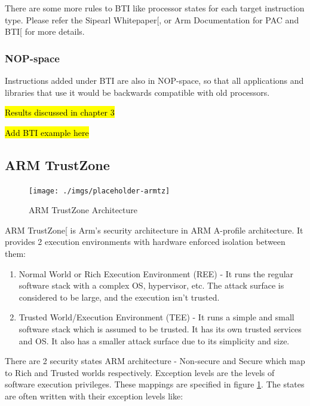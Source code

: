 \documentclass[a4paper, nobind]{templates/ociamthesis}
\providecommand{\tightlist}{%
  \setlength{\itemsep}{0pt}\setlength{\parskip}{0pt}}
\begin{document}
There are some more rules to BTI like processor states for each target instruction type.
Please refer the Sipearl Whitepaper{[}\citeproc{ref-sipearl}{25}{]}, or Arm Documentation for PAC and BTI{[}\citeproc{ref-arm-pacbti}{5}{]} for more details.

\subsubsection{NOP-space}\label{nop-space}

Instructions added under BTI are also in NOP-space, so that all applications and
libraries that use it would be backwards compatible with old processors.

\hl{Results discussed in chapter 3}

\hl{Add BTI example here}

\subsection{ARM TrustZone}\label{arm-trustzone}

\begin{figure}[H]

{\centering \texttt{[image: ./imgs/placeholder-armtz]} 

}

\caption{ARM TrustZone Architecture}\label{fig:armtz-arch}
\end{figure}

ARM TrustZone{[}\citeproc{ref-armtz}{3}{]} is Arm's security architecture in ARM A-profile architecture.
It provides 2 execution environments with hardware enforced isolation between them:

\begin{enumerate}
\def\labelenumi{\arabic{enumi}.}
\tightlist
\item
  Normal World or Rich Execution Environment (REE) - It runs the regular software
  stack with a complex OS, hypervisor, etc. The attack surface is considered to be large,
  and the execution isn't trusted.
\item
  Trusted World/Execution Environment (TEE) - It runs a simple and small software
  stack which is assumed to be trusted. It has its own trusted services and OS.
  It also has a smaller attack surface due to its simplicity and size.
\end{enumerate}

There are 2 security states ARM architecture - Non-secure and Secure which map
to Rich and Trusted worlds respectively.
Exception levels are the levels of software execution privileges.
These mappings are specified in figure \ref{fig:armtz-arch}.
The states are often written with their exception levels like:
\end{document}
